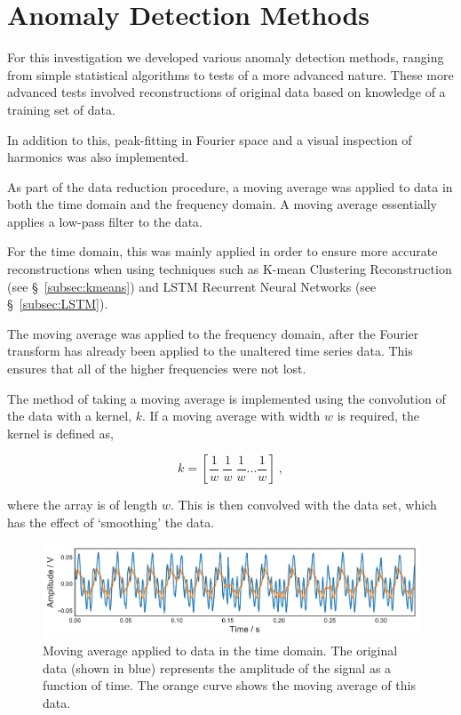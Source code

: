 \section{Anomaly Detection Methods}
\label{sec:methods}

For this investigation we developed various anomaly detection methods, ranging from simple statistical algorithms to tests of a more advanced nature. These more advanced tests involved reconstructions of original data based on knowledge of a training set of data.

In addition to this, peak-fitting in Fourier space and a visual inspection of harmonics was also implemented.

As part of the data reduction procedure, a moving average was applied to data in both the time domain and the frequency domain. A moving average essentially applies a low-pass filter to the data.

For the time domain, this was mainly applied in order to ensure more accurate reconstructions when using techniques such as K-mean Clustering Reconstruction (see \S~\ref{subsec:kmeans}) and LSTM Recurrent Neural Networks (see \S~\ref{subsec:LSTM}).

The moving average was applied to the frequency domain, after the Fourier transform has already been applied to the unaltered time series data. This ensures that all of the higher frequencies were not lost.

The method of taking a moving average is implemented using the convolution of the data with a kernel, $k$. If a moving average with width $w$ is required, the kernel is defined as,

\begin{equation}
    k = \left[ \dfrac{1}{w}~\dfrac{1}{w}~\dfrac{1}{w}...\dfrac{1}{w}  \right]~,
    \label{eq:conv_kernel}
\end{equation}

where the array is of length $w$. This is then convolved with the data set, which has the effect of `smoothing' the data.

\begin{figure}[t]
    \includegraphics[width=1.0\textwidth]{fig/moving_average.pdf}
    \caption[Time Domain]{Moving average applied to data in the time domain. The original data (shown in blue) represents the amplitude of the signal as a function of time. The orange curve shows the moving average of this data.}
    \label{fig:moving_av}
\end{figure}

